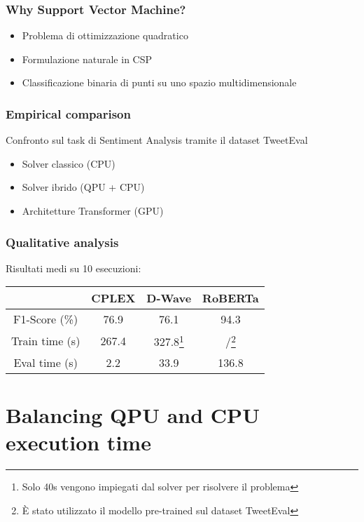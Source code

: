 \documentclass[aspectratio=169]{beamer}
\begin{document}
\begin{frame}
    \frametitle{Why Support Vector Machine?}

    \begin{itemize}
        \item Problema di ottimizzazione quadratico
        \item Formulazione naturale in CSP
        \item Classificazione binaria di punti su uno spazio multidimensionale
    \end{itemize}

\end{frame}

\begin{frame}
    \frametitle{Empirical comparison}

    Confronto sul task di Sentiment Analysis tramite il dataset TweetEval

    \begin{itemize}
        \item Solver classico (CPU)
        \item Solver ibrido (QPU + CPU)
        \item Architetture Transformer (GPU)
    \end{itemize}

\end{frame}

\begin{frame}
    \frametitle{Qualitative analysis}

    Risultati medi su 10 esecuzioni:

    \begin{table}
        \centering
        \begin{tabular}{c|c|c|c}
            & CPLEX & D-Wave & RoBERTa \\ \hline
            F1-Score (\%) & 76.9 & 76.1 & 94.3 \\ \hline
            Train time (s) & 267.4 & 327.8\footnote{Solo 40s vengono impiegati dal solver per risolvere il problema} & /\footnote{È stato utilizzato il modello pre-trained sul dataset TweetEval} \\ \hline
            Eval time (s) & 2.2 & 33.9 & 136.8
        \end{tabular}
    \end{table}

\end{frame}

\section{Balancing QPU and CPU \\execution time}
\end{document}
